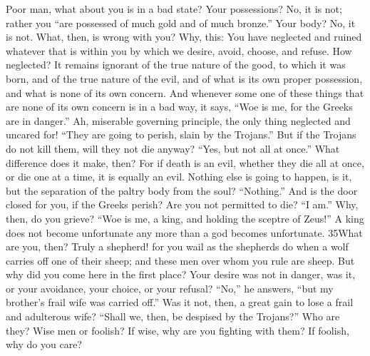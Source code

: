 Poor man, what about you is in a bad state? Your possessions? No, it is not; rather you ``are possessed of much gold and of much bronze.'' Your body? No, it is not. What, then, is wrong with you? Why, this: You have neglected and ruined whatever that is within you by which we desire, avoid, choose, and refuse. How neglected? It remains ignorant of the true nature of the good, to which it was born, and of the true nature of the evil, and of what is its own proper possession, and what is none of its own concern. And whenever some one of these things that are none of its own concern is in a bad way, it says, ``Woe is me, for the Greeks are in danger.'' Ah, miserable governing principle, the only thing neglected and uncared for! ``They are going to perish, slain by the Trojans.'' But if the Trojans do not kill them, will they not die anyway? ``Yes, but not all at once.'' What difference does it make, then? For if death is an evil, whether they die all at once, or die one at a time, it is equally an evil. Nothing else is going to happen, is it, but the separation of the paltry body from the soul? ``Nothing.'' And is the door closed for you, if the Greeks perish? Are you not permitted to die? ``I am.'' Why, then, do you grieve? ``Woe is me, a king, and holding the sceptre of Zeus!'' A king does not become unfortunate any more than a god becomes unfortunate. 35What are you, then? Truly a shepherd! for you wail as the shepherds do when a wolf carries off one of their sheep; and these men over whom you rule are sheep. But why did you come here in the first place? Your desire was not in danger, was it, or your avoidance, your choice, or your refusal? ``No,'' he answers, ``but my brother's frail wife was carried off.'' Was it not, then, a great gain to lose a frail and adulterous wife? ``Shall we, then, be despised by the Trojans?'' Who are they? Wise men or foolish? If wise, why are you fighting with them? If foolish, why do you care?

